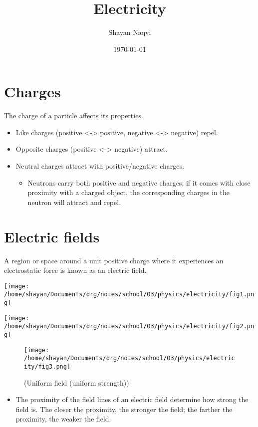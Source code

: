 \documentclass[11pt]{article}
\author{Shayan Naqvi}
\date{\today}
\title{Electricity}
\begin{document}
\maketitle
\tableofcontents

\section{Charges}
\label{sec:org2bb7fd4}
The charge of a particle affects its properties.
\begin{itemize}
\item Like charges (positive <-> positive, negative <-> negative) repel.
\item Opposite charges (positive <-> negative) attract.
\item Neutral charges attract with positive/negative charges.
\begin{itemize}
\item Neutrons carry both positive and negative charges; if it comes with close proximity with a charged object, the corresponding charges in the neutron will attract and repel.
\end{itemize}
\end{itemize}
\section{Electric fields}
\label{sec:orge397806}
A region or space around a unit positive charge where it experiences an electrostatic force is known as an electric field.
\begin{center}
\texttt{[image: /home/shayan/Documents/org/notes/school/O3/physics/electricity/fig1.png]}
\end{center}
\begin{center}
\texttt{[image: /home/shayan/Documents/org/notes/school/O3/physics/electricity/fig2.png]}
\end{center}
\begin{figure}[htbp]
\centering
\texttt{[image: /home/shayan/Documents/org/notes/school/O3/physics/electricity/fig3.png]}
\caption{(Uniform field (uniform strength))}
\end{figure}
\begin{itemize}
\item The proximity of the field lines of an electric field determine how strong the field is. The closer the proximity, the stronger the field; the farther the proximity, the weaker the field.
\end{itemize}
\end{document}

